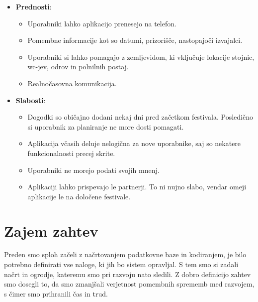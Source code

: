 \documentclass[a4paper,12pt,openright]{book}
\begin{document}
\begin{itemize}
    \item \textbf{Prednosti}:
        \begin{itemize}
            \item Uporabniki lahko aplikacijo prenesejo na telefon.
            \item Pomembne informacije kot so datumi, prizorišče, nastopajoči izvajalci.
            \item Uporabniki si lahko pomagajo z zemljevidom, ki vključuje lokacije stojnic, wc-jev, odrov in polnilnih postaj.
            \item Realnočasovna komunikacija.
        \end{itemize}
    \item \textbf{Slabosti}:
        \begin{itemize}
            \item Dogodki so običajno dodani nekaj dni pred začetkom festivala. Posledično si uporabnik za planiranje ne more dosti pomagati.
            \item Aplikacija včasih deluje nelogična za nove uporabnike, saj so nekatere funkcionalnosti precej skrite.
            \item Uporabniki ne morejo podati svojih mnenj.
            \item Aplikaciji lahko prispevajo le partnerji. To ni nujno slabo, vendar omeji aplikacije le na določene festivale.
        \end{itemize}
\end{itemize}

\chapter{Zajem zahtev}
Preden smo sploh začeli z načrtovanjem podatkovne baze in kodiranjem, je bilo potrebno definirati vse naloge, ki jih bo sistem opravljal.
S tem smo si zadali načrt in ogrodje, kateremu smo pri razvoju nato sledili.
Z dobro definicijo zahtev smo dosegli to, da smo zmanjšali verjetnost pomembnih sprememb med razvojem, s čimer smo prihranili čas in trud.
\end{document}
